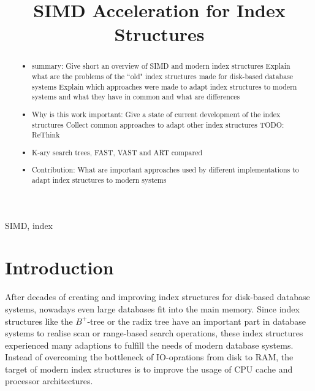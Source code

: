 \documentclass[conference]{IEEEtran}
\begin{document}
\title{SIMD Acceleration for Index Structures\\
}

\author{
}

\maketitle

\begin{abstract}
\begin{itemize}
	\item summary: 
	\subitem Give short an overview of SIMD and modern index structures
	\subitem Explain what are the problems of the ``old" index structures made for disk-based database systems
	\subitem Explain which approaches were made to adapt index structures to modern systems and what they have in common and what are differences
	\item Why is this work important: 
	\subitem Give a state of current development of the index structures
	\subitem Collect common approaches to adapt other index structures TODO: ReThink
	\item K-ary search trees, FAST, VAST and ART compared
	\item Contribution: What are important approaches used by different implementations to adapt index structures to modern systems
\end{itemize}
\end{abstract}

\begin{IEEEkeywords}
SIMD, index 
\end{IEEEkeywords}

\section{Introduction}
After decades of creating and improving index structures for disk-based database systems, nowadays even large databases fit into the main memory. Since index structures like the $B^+$-tree or the radix tree have an important part in database systems to realise scan or range-based search operations, these index structures experienced many adaptions to fulfill the needs of modern database systems. Instead of overcoming the bottleneck of IO-oprations from disk to RAM, the target of modern index structures is to improve the usage of CPU cache and processor architectures.
\end{document}
